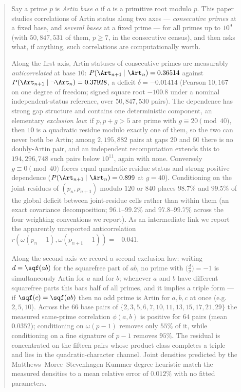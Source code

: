 \begin{abstract}
	Say a prime $p$ is \emph{Artin base $a$} if $a$ is a primitive root modulo $p$.
	This paper studies correlations of Artin status along two axes --- \emph{consecutive
	primes} at a fixed base, and \emph{several bases} at a fixed prime --- for all primes up to $10^9$ (with $50{,}847{,}531$ of them, $p\ge 7$, in the
	consecutive census), and then asks what, if anything, such correlations are
	computationally worth.

	Along the first axis, Artin statuses of consecutive primes are measurably
	\emph{anticorrelated} at base $10$: $P(\Art_{n+1}\mid\Art_n)=0.36514$ against
	$P(\Art_{n+1}\mid\lnot\Art_n)=0.37928$, a deficit $\delta=-0.01414$
	(Pearson $10{,}167$ on one degree of freedom; signed square root $-100.8$ under a
	nominal independent-status reference, over $50{,}847{,}530$ pairs). The dependence
	has strong gap structure and contains one deterministic component, an elementary
	\emph{exclusion law}: if $p,p+g>5$ are prime with $g\equiv 20 \pmod{40}$, then $10$
	is a quadratic residue modulo exactly one of them, so the two can never both be
	Artin; among $2{,}195{,}882$ pairs at gaps $20$ and $60$ there is no doubly-Artin
	pair, and an independent recomputation extends this to $194{,}296{,}748$ such pairs
	below $10^{11}$, again with none. Conversely $g \equiv 0 \pmod{40}$ forces equal
	quadratic-residue status and strong positive dependence ($P(\Art_{n+1}\mid\Art_n)=0.899$
	at $g=40$). Conditioning on the joint residues of $(p_n,p_{n+1})$ modulo $120$ or
	$840$ places $98.7\%$ and $99.5\%$ of the global deficit between joint-residue cells
	rather than within them (an exact covariance decomposition; $96.1$--$99.2\%$ and $97.8$--$99.7\%$
	across the four weighting conventions we report). As an intermediate link we report the apparently unreported
	anticorrelation $r(\omega(p_n-1),\omega(p_{n+1}-1))=-0.041$.

	Along the second axis we record a second exclusion law: writing $d=\sqf(ab)$ for the
	squarefree part of $ab$, no prime with $\bigl(\tfrac{d}{p}\bigr)=-1$ is simultaneously
	Artin for $a$ and for $b$; whenever $a$ and $b$ have different squarefree parts this
	bars half of all primes, and it implies a triple form --- if $\sqf(c)=\sqf(ab)$ then no
	odd prime is Artin for $a,b,c$ at once (e.g.\ $2,5,10$). Across the $66$ base pairs of
	$\{2,3,5,6,7,10,11,13,15,17,21,29\}$ the measured same-prime correlation $\phi(a,b)$ is
	positive for $64$ pairs (mean $0.0352$); conditioning on $\omega(p-1)$ removes only
	$55\%$ of it, while conditioning on a fine signature of $p-1$ removes $95\%$. The
	residual is concentrated on the fifteen pairs whose product class completes a triple
	and lies in the quadratic-character channel. Joint densities predicted by the
	Matthews--Moree--Stevenhagen Kummer-degree heuristic match the measured densities to a
	mean relative error of $0.012\%$ with no fitted parameters.


\end{abstract}
